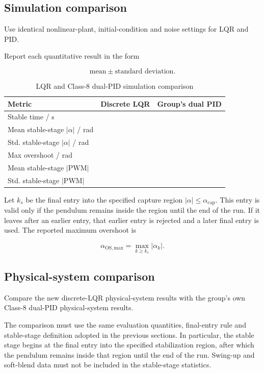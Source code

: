 \documentclass[11pt,a4paper]{article}
\begin{document}
\subsection{Simulation comparison}

Use identical nonlinear-plant, initial-condition and noise settings for LQR and
PID.

Report each quantitative result in the form

\[
\text{mean}\pm\text{standard deviation}.
\]

\begin{table}[H]
\centering
\caption{LQR and Class-8 dual-PID simulation comparison}
\label{tab:lqrpidsim}
\begin{tabular}{lcc}
\toprule
Metric & Discrete LQR & Group's dual PID\\
\midrule
Stable time / s & & \\
Mean stable-stage $|\alpha|$ / rad & & \\
Std. stable-stage $|\alpha|$ / rad & & \\
Max overshoot / rad & & \\
Mean stable-stage $|\mathrm{PWM}|$ & & \\
Std. stable-stage $|\mathrm{PWM}|$ & & \\
\bottomrule
\end{tabular}
\end{table}

Let $k_s$ be the final entry into the specified capture region
$|\alpha|\leq\alpha_{\mathrm{cap}}$. This entry is valid only if the pendulum
remains inside the region until the end of the run. If it leaves after an
earlier entry, that earlier entry is rejected and a later final entry is used.
The reported maximum overshoot is

\[
\alpha_{\mathrm{OS,max}}=\max_{k\geq k_s}|\alpha_k|.
\]

\subsection{Physical-system comparison}

Compare the new discrete-LQR physical-system results with the group's own
Class-8 dual-PID physical-system results.

The comparison must use the same evaluation quantities, final-entry rule and stable-stage definition
adopted in the previous sections. In particular, the
stable stage begins at the final entry into the specified stabilization region,
after which the pendulum remains inside that region until the end of the run.
Swing-up and soft-blend data must not be included in the stable-stage
statistics.
\end{document}
